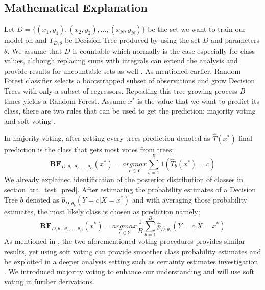 \subsection{Mathematical Explanation}
Let $D = \{(x_{1},y_{1}), (x_{2}, y_{2}), ... , (x_{N}, y_{N})\}$ 
be the set we want to train our model on and $T_{D, \theta}$ be 
Decision Tree produced by using the set $D$ and parameters $\theta$. 
We assume that $D$ is countable which normally is the 
case especially for class values, although replacing sums with integrals can extend the analysis and 
provide results for uncountable sets as well \cite{kohavi1996bias}. As mentioned earlier, 
Random Forest classifier selects a bootstrapped subset of observations and 
grow Decision Trees with only a subset of regressors. 
Repeating this tree growing process $B$ times 
yields a Random Forest. Assume $x^*$ is the value that we want to predict its class, 
there are two rules that can be used to get the prediction; majority voting and 
soft voting \cite{louppe2014understanding}\cite{zhou2012ensemble}.

In majority voting, after getting every trees prediction denoted as $\hat{T}(x^*)$ final prediction is the class that gets most votes from trees:
\begin{equation}
\boldsymbol{RF}_{D, \theta_{1}, \theta_{2}, ..., \theta_{B}} (x^*) =
	\underset{c \in Y}{argmax} \sum_{b = 1}^{B}{1(\hat{T}_{b}(x^*) = c)}
\end{equation}
We already explained identification of the posterior distribution of classes in section \ref{tra_test_pred}. 
After estimating the probability estimates of a Decision Tree $b$ 
denoted as $\hat{p}_{D, \theta_{b}} (Y = c | X = x^*)$ and 
with averaging those probability estimates, the most likely class is chosen as prediction 
namely;
\begin{equation}
\boldsymbol{RF}_{D, \theta_{1}, \theta_{2}, ..., \theta_{B}} (x^*) =
	\underset{c \in Y}{argmax} \dfrac{1}{B}\sum_{b = 1}^{B}{\hat{p}_{D, \theta_{b}} (Y = c | X = x^*)}
\end{equation}
As mentioned in \cite{breiman1996bagging}, the two aforementioned voting procedures provides similar results, 
yet using soft voting can provide smoother class probability estimates and be exploited in a deeper analysis setting such as 
certainty estimates investigation \cite{louppe2014understanding}. 
We introduced majority voting to enhance our understanding and will use soft voting in further derivations. 

